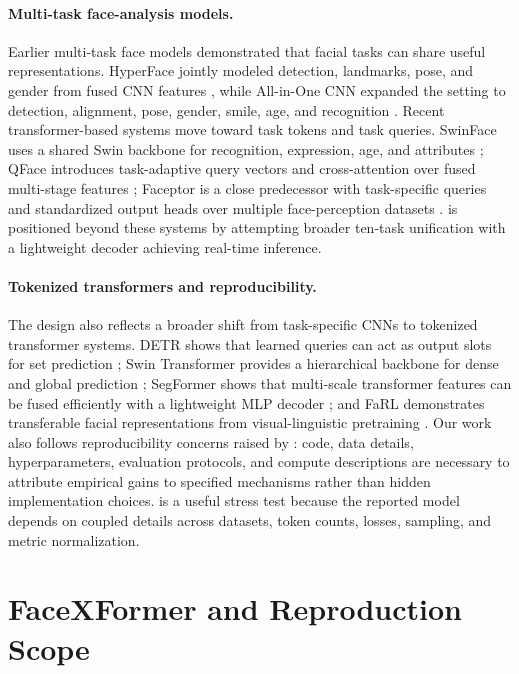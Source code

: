 \paragraph{Multi-task face-analysis models.}
Earlier multi-task face models demonstrated that facial tasks can share useful representations. HyperFace jointly modeled detection, landmarks, pose, and gender from fused CNN features \citep{hyperface2019}, while All-in-One CNN expanded the setting to detection, alignment, pose, gender, smile, age, and recognition \citep{allinone2017}. Recent transformer-based systems move toward task tokens and task queries. SwinFace uses a shared Swin backbone for recognition, expression, age, and attributes \citep{swinface2024}; QFace introduces task-adaptive query vectors and cross-attention over fused multi-stage features \citep{qface2024}; Faceptor is a close predecessor with task-specific queries and standardized output heads over multiple face-perception datasets \citep{faceptor2024}. \method is positioned beyond these systems by attempting broader ten-task unification with a lightweight decoder \citep{facexformer2025} achieving real-time inference.

\paragraph{Tokenized transformers and reproducibility.}
The design also reflects a broader shift from task-specific CNNs to tokenized transformer systems. DETR shows that learned queries can act as output slots for set prediction \citep{detr2020}; Swin Transformer provides a hierarchical backbone for dense and global prediction \citep{swin2021}; SegFormer shows that multi-scale transformer features can be fused efficiently with a lightweight MLP decoder \citep{segformer2021}; and FaRL demonstrates transferable facial representations from visual-linguistic pretraining \citep{farl2022}. Our work also follows reproducibility concerns raised by \citep{pineau2021,lipton2018}: code, data details, hyperparameters, evaluation protocols, and compute descriptions are necessary to attribute empirical gains to specified mechanisms rather than hidden implementation choices. \method is a useful stress test because the reported model depends on coupled details across datasets, token counts, losses, sampling, and metric normalization.

\section{FaceXFormer and Reproduction Scope}

